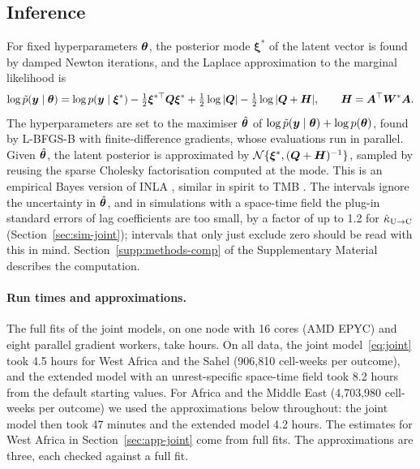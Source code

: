 \subsection{Inference}\label{sec:methods-inference}

For fixed hyperparameters $\bm{\theta}$, the posterior mode $\bm{\xi}^*$ of the latent
vector is found by damped Newton iterations, and the Laplace approximation to the
marginal likelihood is
\begin{equation}\label{eq:laplace}
\log \tilde p(\bm{y}\mid\bm{\theta}) = \log p(\bm{y}\mid\bm{\xi}^*)
- \tfrac12 \bm{\xi}^{*\top}\bm{Q}\bm{\xi}^* + \tfrac12\log|\bm{Q}| - \tfrac12\log|\bm{Q} + \bm{H}|,
\qquad \bm{H} = \bm{A}^\top\bm{W}^*\bm{A} .
\end{equation}
The hyperparameters are set to the maximiser $\hat{\bm{\theta}}$ of
$\log\tilde p(\bm{y}\mid\bm{\theta}) + \log p(\bm{\theta})$, found by L-BFGS-B with
finite-difference gradients, whose evaluations run in parallel. Given $\hat{\bm{\theta}}$,
the latent posterior is approximated by $\mathcal{N}\{\bm{\xi}^*, (\bm{Q} + \bm{H})^{-1}\}$,
sampled by reusing the sparse Cholesky factorisation computed at the mode. This is an
empirical Bayes version of INLA \citep{rue2009inla}, similar in spirit to TMB
\citep{kristensen2016tmb}. The intervals ignore the uncertainty in $\hat{\bm{\theta}}$, and
in simulations with a space-time field the plug-in standard errors of lag
coefficients are too small, by a factor of up to 1.2 for $\hat\kappa_{\mathrm{U}\to\mathrm{C}}$
(Section~\ref{sec:sim-joint}); intervals that only just exclude zero should be read
with this in mind. Section~\ref{supp:methods-comp} of the Supplementary Material
describes the computation.

\paragraph{Run times and approximations.} The full fits of the joint models, on one
node with 16 cores (AMD EPYC) and eight parallel gradient workers, take hours. On all data, the
joint model~\eqref{eq:joint} took 4.5 hours for West Africa and the Sahel (906{,}810
cell-weeks per outcome), and the extended model with an unrest-specific space-time field
took 8.2 hours from the default starting values. For Africa and the Middle East
(4{,}703{,}980 cell-weeks per outcome) we used the approximations below throughout:
the joint model then took 47 minutes and the extended model 4.2 hours. The estimates
for West Africa in Section~\ref{sec:app-joint} come from full fits. The approximations
are three, each checked against a full fit.

